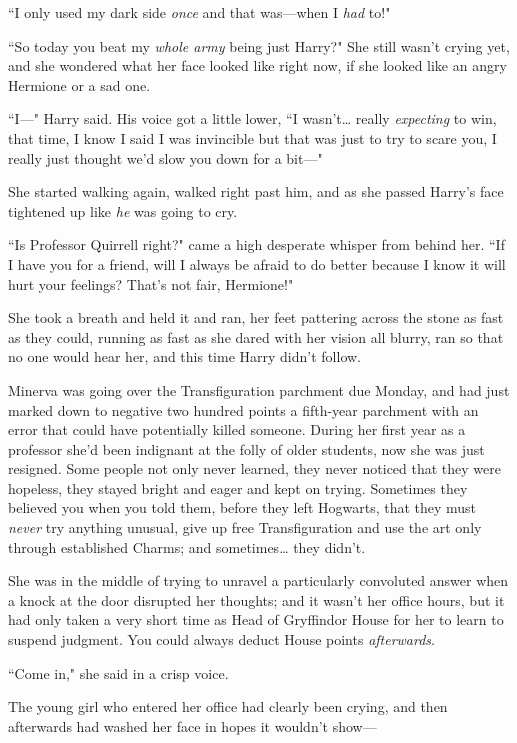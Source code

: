 ``I only used my dark side \emph{once} and that was—when I \emph{had} to!"

``So today you beat my \emph{whole army} being just Harry?" She still wasn't crying yet, and she wondered what her face looked like right now, if she looked like an angry Hermione or a sad one.

``I—" Harry said. His voice got a little lower, ``I wasn't{\ldots} really \emph{expecting} to win, that time, I know I said I was invincible but that was just to try to scare you, I really just thought we'd slow you down for a bit—"

She started walking again, walked right past him, and as she passed Harry's face tightened up like \emph{he} was going to cry.

``Is Professor Quirrell right?" came a high desperate whisper from behind her. ``If I have you for a friend, will I always be afraid to do better because I know it will hurt your feelings? That's not fair, Hermione!"

She took a breath and held it and ran, her feet pattering across the stone as fast as they could, running as fast as she dared with her vision all blurry, ran so that no one would hear her, and this time Harry didn't follow.

\later

Minerva was going over the Transfiguration parchment due Monday, and had just marked down to negative two hundred points a fifth-year parchment with an error that could have potentially killed someone. During her first year as a professor she'd been indignant at the folly of older students, now she was just resigned. Some people not only never learned, they never noticed that they were hopeless, they stayed bright and eager and kept on trying. Sometimes they believed you when you told them, before they left Hogwarts, that they must \emph{never} try anything unusual, give up free Transfiguration and use the art only through established Charms; and sometimes{\ldots} they didn't.

She was in the middle of trying to unravel a particularly convoluted answer when a knock at the door disrupted her thoughts; and it wasn't her office hours, but it had only taken a very short time as Head of Gryffindor House for her to learn to suspend judgment. You could always deduct House points \emph{afterwards}.

``Come in," she said in a crisp voice.

The young girl who entered her office had clearly been crying, and then afterwards had washed her face in hopes it wouldn't show—

